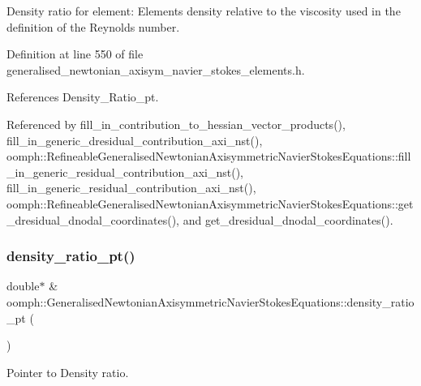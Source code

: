 Density ratio for element\+: Element\textquotesingle{}s density relative to the viscosity used in the definition of the Reynolds number. 



Definition at line 550 of file generalised\+\_\+newtonian\+\_\+axisym\+\_\+navier\+\_\+stokes\+\_\+elements.\+h.



References Density\+\_\+\+Ratio\+\_\+pt.



Referenced by fill\+\_\+in\+\_\+contribution\+\_\+to\+\_\+hessian\+\_\+vector\+\_\+products(), fill\+\_\+in\+\_\+generic\+\_\+dresidual\+\_\+contribution\+\_\+axi\+\_\+nst(), oomph\+::\+Refineable\+Generalised\+Newtonian\+Axisymmetric\+Navier\+Stokes\+Equations\+::fill\+\_\+in\+\_\+generic\+\_\+residual\+\_\+contribution\+\_\+axi\+\_\+nst(), fill\+\_\+in\+\_\+generic\+\_\+residual\+\_\+contribution\+\_\+axi\+\_\+nst(), oomph\+::\+Refineable\+Generalised\+Newtonian\+Axisymmetric\+Navier\+Stokes\+Equations\+::get\+\_\+dresidual\+\_\+dnodal\+\_\+coordinates(), and get\+\_\+dresidual\+\_\+dnodal\+\_\+coordinates().

\mbox{\label{classoomph_1_1GeneralisedNewtonianAxisymmetricNavierStokesEquations_aae4b90a81f764bfcf3cd43e0bdb901cf}} 
\subsubsection{\texorpdfstring{density\+\_\+ratio\+\_\+pt()}{density\_ratio\_pt()}}
{\footnotesize\ttfamily double$\ast$ \& oomph\+::\+Generalised\+Newtonian\+Axisymmetric\+Navier\+Stokes\+Equations\+::density\+\_\+ratio\+\_\+pt (\begin{DoxyParamCaption}{ }\end{DoxyParamCaption})\hspace{0.3cm}{\ttfamily [inline]}}



Pointer to Density ratio. 



